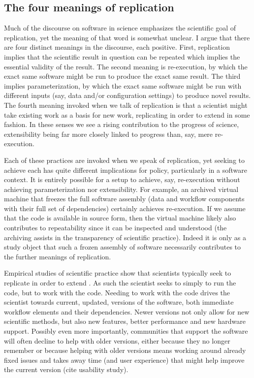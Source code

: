 \documentclass{sigchi}
\begin{document}
\subsection{The four meanings of replication}

Much of the discourse on software in science emphasizes the scientific goal of replication, yet the meaning of that word is somewhat unclear.  I argue that there are four distinct meanings in the discourse, each positive. First, replication implies that the scientific result in question can be repeated which implies the essential validity of the result. The second meaning is re-execution, by which the exact same software might be run to produce the exact same result. The third implies parameterization, by which the exact same software might be run with different inputs (say, data and/or configuration settings) to produce novel results. The fourth meaning invoked when we talk of replication is that a scientist might take existing work as a basis for new work, replicating in order to extend in some fashion. In these senses we see a rising contribution to the progress of science, extensibility being far more closely linked to progress than, say, mere re-execution.

Each of these practices are invoked when we speak of replication, yet seeking to achieve each has quite different implications for policy, particularly in a software context. It is entirely possible for a setup to achieve, say, re-execution without achieving parameterization nor extensibility. For example, an archived virtual machine that freezes the full software assembly (data and workflow components with their full set of dependencies) certainly achieves re-execution. If we assume that the code is available in source form, then the virtual machine likely also contributes to repeatability since it can be inspected and understood (the archiving assists in the transparency of scientific practice). Indeed it is only as a study object that such a frozen assembly of software necessarily contributes to the further meanings of replication.

Empirical studies of scientific practice show that scientists typically seek to replicate in order to extend . As such the scientist seeks to simply to run the code, but to work with the code. Needing to work with the code drives the scientist towards current, updated, versions of the software, both immediate workflow elements and their dependencies. Newer versions not only allow for new scientific methods, but also new features, better performance and new hardware support. Possibly even more importantly, communities that support the software will often decline to help with older versions, either because they no longer remember or because helping with older versions means working around already fixed issues and takes away time (and user experience) that might help improve the current version (cite usability study). 
\end{document}
